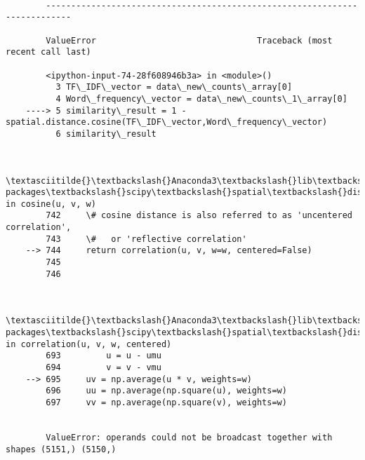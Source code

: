 \documentclass[11pt]{article}
\begin{document}
    \begin{Verbatim}[commandchars=\\\{\}]

        ---------------------------------------------------------------------------

        ValueError                                Traceback (most recent call last)

        <ipython-input-74-28f608946b3a> in <module>()
          3 TF\_IDF\_vector = data\_new\_counts\_array[0]
          4 Word\_frequency\_vector = data\_new\_counts\_1\_array[0]
    ----> 5 similarity\_result = 1 -spatial.distance.cosine(TF\_IDF\_vector,Word\_frequency\_vector)
          6 similarity\_result
    

        \textasciitilde{}\textbackslash{}Anaconda3\textbackslash{}lib\textbackslash{}site-packages\textbackslash{}scipy\textbackslash{}spatial\textbackslash{}distance.py in cosine(u, v, w)
        742     \# cosine distance is also referred to as 'uncentered correlation',
        743     \#   or 'reflective correlation'
    --> 744     return correlation(u, v, w=w, centered=False)
        745 
        746 
    

        \textasciitilde{}\textbackslash{}Anaconda3\textbackslash{}lib\textbackslash{}site-packages\textbackslash{}scipy\textbackslash{}spatial\textbackslash{}distance.py in correlation(u, v, w, centered)
        693         u = u - umu
        694         v = v - vmu
    --> 695     uv = np.average(u * v, weights=w)
        696     uu = np.average(np.square(u), weights=w)
        697     vv = np.average(np.square(v), weights=w)
    

        ValueError: operands could not be broadcast together with shapes (5151,) (5150,) 

    \end{Verbatim}


    
    
    
    
\end{document}
